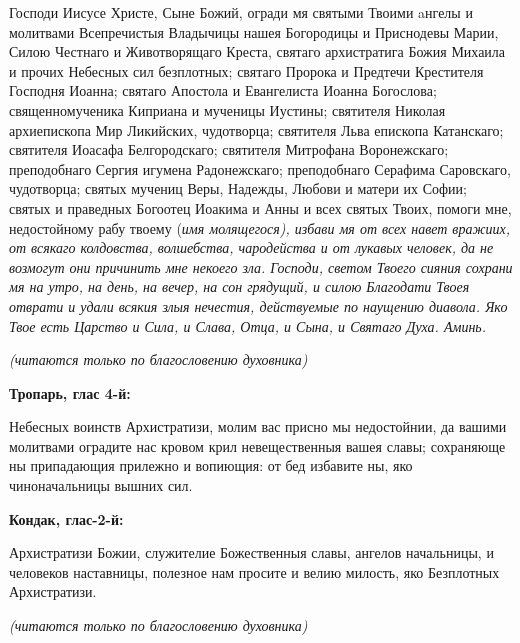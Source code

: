 Господи Иисусе Христе, Сыне Божий, огради мя святыми Твоими aнгелы и молитвами Всепречистыя Владычицы нашея Богородицы и Приснодевы Марии, Силою Честнаго и Животворящаго Креста, святаго архистратига Божия Михаила и прочих Небесных сил безплотных; святаго Пророка и Предтечи Крестителя Господня Иоанна; святаго Апостола и Евангелиста Иоанна Богослова; священномученика Киприана и мученицы Иустины; святителя Николая архиепископа Мир Ликийских, чудотворца; святителя Льва епископа Катанскаго; святителя Иоасафа Белгородскаго; святителя Митрофана Воронежскаго; преподобнаго Сергия игумена Радонежскаго; преподобнаго Серафима Саровскаго,  чудотворца; святых мучениц Веры, Надежды, Любови и матери их Софии; святых и праведных Богоотец Иоакима и Анны и всех святых Твоих, помоги мне, недостойному рабу твоему (\itshape имя молящегося\normalfont{}), избави мя от всех навет вражиих, от всякаго колдовства, волшебства, чародейства и от лукавых человек, да не возмогут они причинить мне некоего зла. Господи, светом Твоего сияния сохрани мя на утро, на день, на вечер, на сон грядущий, и силою Благодати Твоея отврати и удали всякия злыя нечестия, действуемые по наущению диавола. Яко Твое есть Царство и Сила, и Слава, Отца, и Сына, и Святаго Духа. Аминь. 


\mychapterending

 


\itshape (читаются только по благословению духовника)

\normalfont{}

\bfseries Тропарь, глас 4-й:\normalfont{}


Небесных воинств Архистратизи, молим вас присно мы недостойнии, да вашими молитвами оградите нас кровом крил невещественныя вашея славы; сохраняюще ны припадающия прилежно и вопиющия: от бед избавите ны, яко чиноначальницы вышних сил. 


\bfseries Кондак, глас-2-й\normalfont{}:


Архистратизи Божии, служителие Божественныя славы, ангелов начальницы, и человеков наставницы, полезное нам просите и велию милость, яко Безплотных Архистратизи. 


\mychapterending

 


\itshape (читаются только по благословению духовника)

